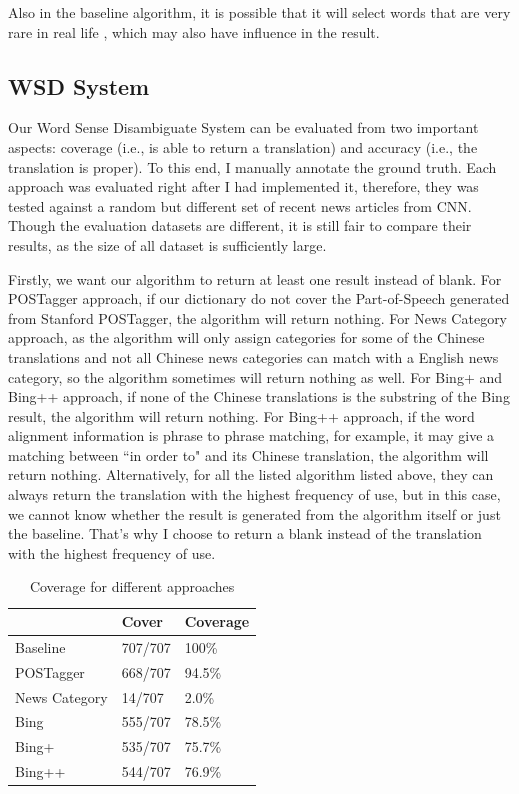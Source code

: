 Also in the baseline algorithm, it is possible that it will select words that are very rare in real life \cite{sus13}, which may also have influence in the result.

\subsection{WSD System}
Our Word Sense Disambiguate System can be evaluated from two important aspects: coverage (i.e., is able to return a translation) and accuracy (i.e., the translation is proper). To this end, I manually annotate the ground truth. Each approach was evaluated  right after I had implemented it, therefore,  they was tested against a random but different set of recent news articles from CNN.  Though the evaluation datasets are different, it is still fair to compare their results, as the size of all dataset is sufficiently large. 

Firstly, we want our algorithm to return at least one result instead of blank. For POSTagger approach, if our dictionary do not cover the Part-of-Speech generated from Stanford POSTagger, the algorithm will return nothing. For News Category approach, as the algorithm will only assign categories for some of the Chinese translations and not all Chinese news categories can match with a English news category, so the algorithm sometimes will return nothing as well. For Bing+ and Bing++ approach, if none of the Chinese translations is the substring of the Bing result, the algorithm will return nothing. For Bing++ approach, if the word alignment information is phrase to phrase matching, for example, it may give a matching between ``in order to" and its Chinese translation, the algorithm will return nothing. Alternatively, for all the listed algorithm listed above, they can always return the translation with the highest frequency of use, but in this case, we cannot know whether the result is generated from the algorithm itself or just the baseline. That's why I choose to return a blank instead of the translation with the highest frequency of use.

\begin{table}[ht]
  \caption{Coverage for different approaches}
  \label{table:evaluation_1}
  \begin{tabular}{| p{2cm} | p{2cm} | p{2cm} |}
    \hline
     & Cover & Coverage\\
    \hline
    Baseline & 707/707 & 100\%\\
    \hline
    POSTagger & 668/707 & 94.5\%\\
    \hline
    News Category & 14/707 & 2.0\%\\
    \hline
    Bing & 555/707 & 78.5\%\\
    \hline
    Bing+ & 535/707 & 75.7\%\\
    \hline
    Bing++ & 544/707 & 76.9\%\\
    \hline
  \end{tabular}
\end{table}

